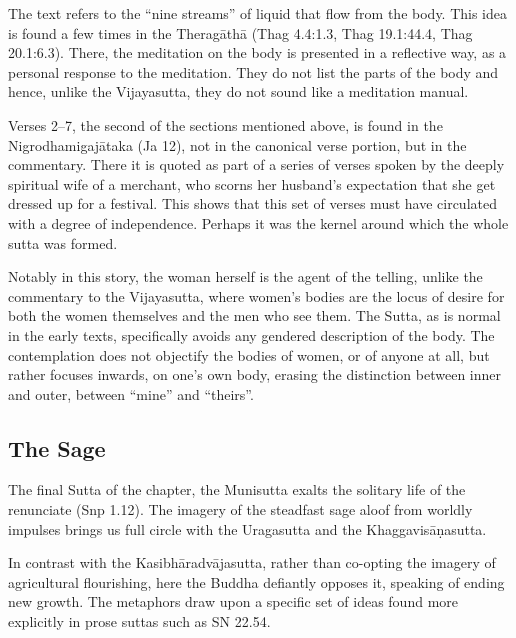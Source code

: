 \documentclass[12pt,openany]{book}%
\begin{document}
The text refers to the “nine streams” of liquid that flow from the body. This idea is found a few times in the \textsanskrit{Theragāthā} (Thag 4.4:1.3, Thag 19.1:44.4, Thag 20.1:6.3). There, the meditation on the body is presented in a reflective way, as a personal response to the meditation. They do not list the parts of the body and hence, unlike the Vijayasutta, they do not sound like a meditation manual.

Verses 2–7, the second of the sections mentioned above, is found in the \textsanskrit{Nigrodhamigajātaka} (Ja 12), not in the canonical verse portion, but in the commentary. There it is quoted as part of a series of verses spoken by the deeply spiritual wife of a merchant, who scorns her husband’s expectation that she get dressed up for a festival. This shows that this set of verses must have circulated with a degree of independence. Perhaps it was the kernel around which the whole sutta was formed.

Notably in this story, the woman herself is the agent of the telling, unlike the commentary to the Vijayasutta, where women’s bodies are the locus of desire for both the women themselves and the men who see them. The Sutta, as is normal in the early texts, specifically avoids any gendered description of the body. The contemplation does not objectify the bodies of women, or of anyone at all, but rather focuses inwards, on one’s own body, erasing the distinction between inner and outer, between “mine” and “theirs”.

\subsection*{The Sage}

The final Sutta of the chapter, the Munisutta exalts the solitary life of the renunciate (Snp 1.12). The imagery of the steadfast sage aloof from worldly impulses brings us full circle with the Uragasutta and the \textsanskrit{Khaggavisāṇasutta}.

In contrast with the \textsanskrit{Kasibhāradvājasutta}, rather than co-opting the imagery of agricultural flourishing, here the Buddha defiantly opposes it, speaking of ending new growth. The metaphors draw upon a specific set of ideas found more explicitly in prose suttas such as SN 22.54.
\end{document}

